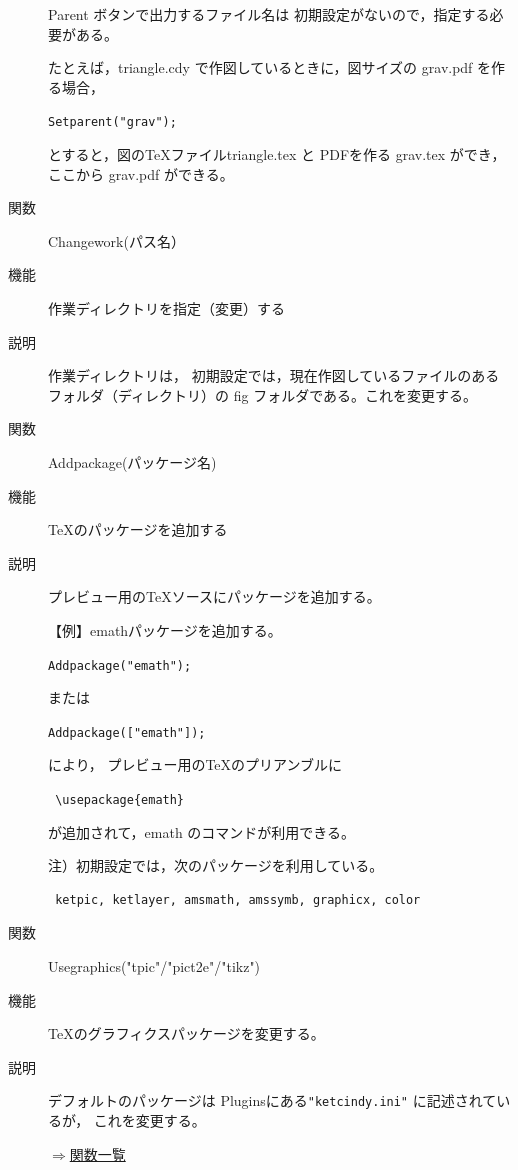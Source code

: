 \documentclass[papersize,a4paper,12pt,uplatex]{jsarticle}
\begin{document}
\begin{description}
Parent ボタンで出力するファイル名は 初期設定がないので，指定する必要がある。

たとえば，triangle.cdy で作図しているときに，図サイズの grav.pdf を作る場合，

\hspace{10mm} \verb|Setparent("grav");|

とすると，図のTeXファイルtriangle.tex と PDFを作る grav.tex ができ，ここから grav.pdf ができる。

\vspace{\baselineskip}
\hypertarget{changework}{}
\item[関数]Changework(パス名）
\item[機能]作業ディレクトリを指定（変更）する
\item[説明]作業ディレクトリは， 初期設定では，現在作図しているファイルのあるフォルダ（ディレクトリ）の fig フォルダである。これを変更する。

\vspace{\baselineskip}
\hypertarget{addpackage}{}
\item[関数]Addpackage(パッケージ名)
\item[機能]TeXのパッケージを追加する
\item[説明]プレビュー用のTeXソースにパッケージを追加する。 

\vspace{\baselineskip}
 【例】emathパッケージを追加する。
 
\hspace{10mm}\verb|Addpackage("emath"); | 
 
 または
 
\hspace{10mm}\verb|Addpackage(["emath"]); | 
 
 により，
プレビュー用のTeXのプリアンブルに

\hspace{10mm}\verb| \usepackage{emath}|

が追加されて，emath のコマンドが利用できる。

\vspace{\baselineskip}
注）初期設定では，次のパッケージを利用している。
\begin{verbatim}
 ketpic, ketlayer, amsmath, amssymb, graphicx, color 
 \end{verbatim}

\vspace{\baselineskip}
\hypertarget{usegraphics}{}
\item[関数]Usegraphics("tpic"/"pict2e"/"tikz")
\item[機能]TeXのグラフィクスパッケージを変更する。
\item[説明]デフォルトのパッケージは Pluginsにある\verb|"ketcindy.ini"| に記述されているが，
これを変更する。

\begin{flushright}\hyperlink{functionlist}{$\Rightarrow$関数一覧}\end{flushright}

\end{description}
\newpage
\end{document}
